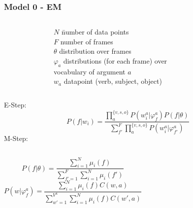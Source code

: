 \documentclass{beamer}
\renewcommand\phi\varphi
\begin{document}
\begin{frame}
  \frametitle{Model 0 - EM }
  \begin{columns}
    \begin{figure}
    
    \end{figure}
  \begin{scriptsize}
  \begin{tabbing}
    $N$ \hspace{10pt}\= number of data points\\
    $F$              \> number of frames\\
    $\theta$         \> distribution over frames\\
    $\varphi_a$      \> distributions (for each frame) over \\ 
                     \> vocabulary of argument $a$\\
    $w_a$            \> datapoint (verb, subject, object)\\
  \end{tabbing}
  \end{scriptsize}
  \end{columns}
\footnotesize{E-Step:}
\[
P(f|w_i) = \frac{\prod_a^{\{v,s,o\}}P(w_i^a|\phi_f^a) P(f|\theta)}{\sum_{f'}^F\prod_a^{\{v,s,o\}}P(w_i^a|\phi_{f'}^a)}
\]
\footnotesize{M-Step:}
\begin{columns}
\[
P(f|\theta) = \frac{\sum_{i=1}^N \mu_i(f)}{\sum_{f'=1}^F\sum_{i=1}^N\mu_i(f')}
\]
\[
P(w|\phi_f^a) = \frac{\sum_{i=1}^N \mu_i(f) C(w,a)}{\sum_{w'=1}^{V^a}\sum_{i=1}^N \mu_i(f) C(w',a)}
\]
\end{columns}
\end{frame}
\end{document}
